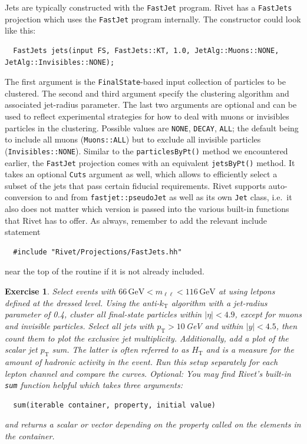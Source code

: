 \documentclass[10pt,fleqn]{scrartcl}
\theoremstyle{exstyle}
\newtheorem{exercise}{Exercise}
\begin{document}
Jets are typically constructed with the \texttt{FastJet} program.
Rivet has a \verb|FastJets| projection which uses the \texttt{FastJet} 
program internally. The constructor could look like this:
\begin{small}
\begin{verbatim}
  FastJets jets(input FS, FastJets::KT, 1.0, JetAlg::Muons::NONE, JetAlg::Invisibles::NONE);
\end{verbatim}
\end{small}
The first argument is the \verb|FinalState|-based input collection of particles to be clustered.
The second and third argument specify the clustering algorithm and associated jet-radius parameter.
The last two arguments are optional and can be used to reflect experimental strategies for
how to deal with muons or invisibles particles in the clustering.
Possible values are \verb|NONE|, \verb|DECAY|, \verb|ALL|; the default being 
to include all muons (\verb|Muons::ALL|) but to exclude all invisible particles (\verb|Invisibles::NONE|).
Similar to the \verb|particlesByPt()| method we encountered earlier, the \verb|FastJet| projection
comes with an equivalent \verb|jetsByPt()| method. It takes an optional \verb|Cuts| argument as well, 
which allows to efficiently select a subset of the jets that pass certain fiducial requirements.
Rivet supports auto-conversion to and from \verb|fastjet::pseudoJet| as well as its own \verb|Jet| class,
i.e.\ it also does not matter which version is passed into the various built-in functions that Rivet has to offer.
As always, remember to add the relevant include statement
\begin{verbatim}
  #include "Rivet/Projections/FastJets.hh"
\end{verbatim}
near the top of the routine if it is not already included.


\begin{exercise}
Select events with $66\,\text{GeV} < m_{\ell\ell} < 116\,\text{GeV}$ at using letpons
defined at the dressed level.
Using the anti-$k_\text{T}$ algorithm with a jet-radius parameter of 0.4,
cluster all final-state particles within $|\eta| < 4.9$, 
except for muons and invisible particles.
Select all jets with $p_\text{T} > 10$\,GeV and within $|y| < 4.5$,
then count them to plot the exclusive jet multiplicity.
Additionally, add a plot of the scalar jet $p_\text{T}$ sum.
The latter is often referred to as $H_\text{T}$ and is a measure
for the amount of hadronic activity in the event.
Run this setup separately for each lepton channel and compare the curves.
\emph{Optional:} You may find Rivet's built-in \verb|sum| function
helpful which takes three arguments:
\begin{verbatim}
  sum(iterable container, property, initial value)
\end{verbatim}
and returns a scalar or vector depending on the property called
on the elements in the container.
\end{exercise}
\end{document}
